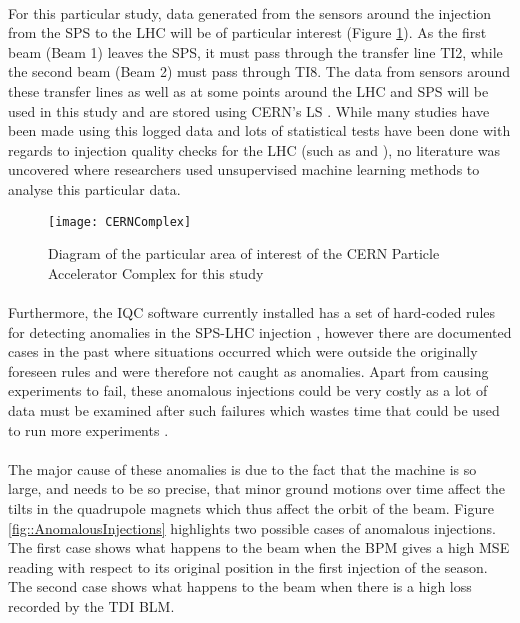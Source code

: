 \paragraph{ }  For this particular study, data generated from the sensors around the injection from the \acs{SPS} to the \acs{LHC} will be of particular interest (Figure \ref{fig::SPStoLHCInjection}). As the first beam (Beam 1) leaves the \acs{SPS}, it must pass through the transfer line TI2, while the second beam (Beam 2) must pass through TI8. The data from sensors around these transfer lines as well as at some points around the \acs{LHC} and \acs{SPS} will be used in this study and are stored using \acs{CERN}'s \ac{LS} \cite{Roderick2013}. While many studies have been made using this logged data and lots of statistical tests have been done with regards to injection quality checks for the \acs{LHC} (such as \cite{Drosdal2011} and \cite{Kain2010}), no literature was uncovered where researchers used unsupervised machine learning methods to analyse this particular data.

\begin{figure}[t]
	\centering
	\texttt{[image: CERNComplex]}
	\caption[The CERN Particle Accelerator Complex]{Diagram of the particular area of interest of the CERN Particle Accelerator Complex for this study}
	\label{fig::SPStoLHCInjection}
\end{figure}

\paragraph{ }Furthermore, the \ac{IQC} software currently installed has a set of hard-coded rules for detecting anomalies in the \acs{SPS}-\acs{LHC} injection \cite{Drosdal2011}, however there are documented cases in the past where situations occurred which were outside the originally foreseen rules and were therefore not caught as anomalies. Apart from causing experiments to fail, these anomalous injections could be very costly as a lot of data must be examined after such failures which wastes time that could be used to run more experiments \cite{Halilovic2018}. 

\paragraph{ }The major cause of these anomalies is due to the fact that the machine is so large, and needs to be so precise, that minor ground motions over time affect the tilts in the quadrupole magnets which thus affect the orbit of the beam. Figure \ref{fig::AnomalousInjections} highlights two possible cases of anomalous injections. The first case shows what happens to the beam when the \acs{BPM} gives a high \ac{MSE} reading with respect to its original position in the first injection of the season. The second case shows what happens to the beam when there is a high loss recorded by the \acs{TDI} \acs{BLM}.

